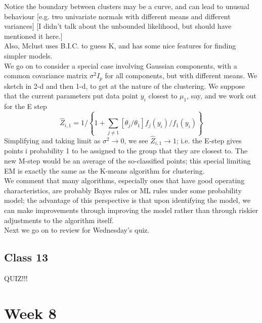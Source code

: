 \documentclass[11pt,a4paper]{article}
\begin{document}
Notice the boundary between clusters may be a curve, and can lead to unusual behaviour [e.g. two univariate normals with different means and different variances] [I didn't talk about the unbounded likelihood, but should have mentioned it here.]\\
Also, Mclust uses B.I.C. to guess K, and has some nice features for finding simpler models.\\
We go on to consider a special case involving Gaussian components, with a common covariance matrix $\sigma^2 I_p$ for all components, but with different means.  We sketch in 2-d and then 1-d, to get at the nature of the clustering.   We suppose that the current parameters put data point $y_i$ closest to $\mu_1$, say, and we work out for the E step
$$\hat{Z}_{i,1} = 1/\left\{ 1 + \sum_{j \neq 1} [\theta_j/\theta_1] f_j(y_i)/f_1(y_i)\right\}$$ 
Simplifying and taking limit as $\sigma^2 \rightarrow 0$, we see $\hat{Z}_{i,1} \rightarrow 1$; i.e. the E-step gives points i probability 1 to be assigned to the group that they are closest to.  The new M-step would be an average of the so-classified points; this special limiting EM is exactly the same as the K-means algorithm for clustering.\\
We comment that many algorithms, especially ones that have good operating characteristics, are probably Bayes rules or ML rules under some probability model; the advantage of this perspective is that upon identifying the model, we can make improvements through improving the model rather than through riskier adjustments to the algorithm itself.\\
Next we go on to review for Wednesday's quiz.

\subsection*{Class 13}
QUIZ!!!


\section*{Week 8}
\end{document}
